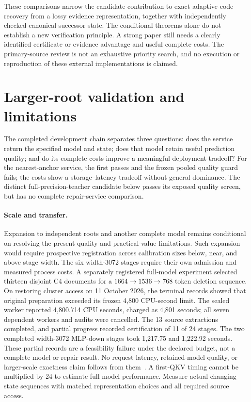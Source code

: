 \documentclass[10pt,twocolumn,letterpaper]{article}
\begin{document}
These comparisons narrow the candidate contribution to exact adaptive-code
recovery from a lossy evidence representation, together with independently
checked canonical successor state. The conditional theorems alone do not
establish a new verification principle. A strong paper still needs a clearly
identified certificate or evidence advantage and useful complete costs. The
primary-source review is not an exhaustive priority search, and no execution or
reproduction of these external implementations is claimed.

\section{Larger-root validation and limitations}
The completed development chain separates three questions: does the service
return the specified model and state; does that model retain useful prediction
quality; and do its complete costs improve a meaningful deployment tradeoff?
For the nearest-anchor service, the first passes and the frozen pooled quality
guard fails; the costs show a storage--latency tradeoff without general dominance.
The distinct full-precision-teacher candidate below passes its exposed quality
screen, but has no complete repair-service comparison.

\paragraph{Scale and transfer.}
Expansion to independent roots and another complete model remains conditional
on resolving the present quality and practical-value limitations. Such expansion
would require prospective registration across calibration sizes below, near,
and above stage width.
The six width-3072 stages require their own admission and measured process costs.
A separately registered full-model experiment selected thirteen disjoint C4
documents for a $1664\to1536\to768$ token deletion sequence. On restoring
cluster access on 11 October 2026, the terminal records showed that original
preparation exceeded its frozen 4,800 CPU-second limit. The sealed worker
reported 4,800.714 CPU seconds, charged as 4,801 seconds; all seven dependent
workers and audits were cancelled. The 13 source extractions completed, and
partial progress recorded certification of 11 of 24 stages. The two completed
width-3072 MLP-down stages took 1,217.75 and 1,222.92 seconds. These partial
records are a feasibility failure under the declared budget, not a complete
model or repair result. No request latency, retained-model quality, or
larger-scale exactness claim follows from them~\cite{v49failure}.
A first-QKV timing cannot be multiplied by 24 to estimate full-model performance.
Measure actual changing-state sequences with matched representation choices and
all required source access.
\end{document}
